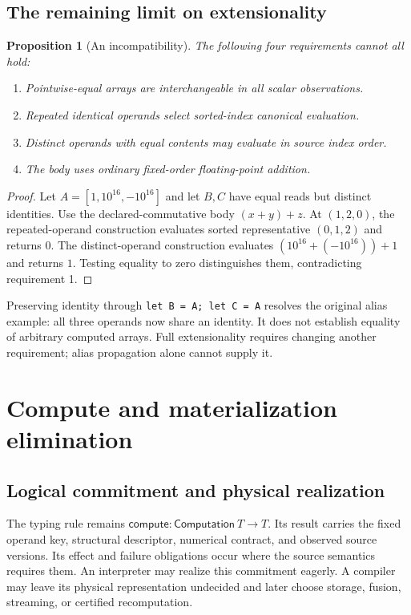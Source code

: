 \documentclass[11pt]{article}
\newtheorem{proposition}[theorem]{Proposition}
\begin{document}
\subsection{The remaining limit on extensionality}
\begin{proposition}[An incompatibility]
The following four requirements cannot all hold:
\begin{enumerate}
\item Pointwise-equal arrays are interchangeable in all scalar observations.
\item Repeated identical operands select sorted-index canonical evaluation.
\item Distinct operands with equal contents may evaluate in source index order.
\item The body uses ordinary fixed-order floating-point addition.
\end{enumerate}
\end{proposition}
\begin{proof}
Let $A=[1,10^{16},-10^{16}]$ and let $B,C$ have equal reads but distinct identities. Use the declared-commutative body $(x+y)+z$. At $(1,2,0)$, the repeated-operand construction evaluates sorted representative $(0,1,2)$ and returns $0$. The distinct-operand construction evaluates $(10^{16}+(-10^{16}))+1$ and returns $1$. Testing equality to zero distinguishes them, contradicting requirement 1.
\end{proof}
Preserving identity through \texttt{let B = A; let C = A} resolves the original alias example: all three operands now share an identity. It does not establish equality of arbitrary computed arrays. Full extensionality requires changing another requirement; alias propagation alone cannot supply it.

\section{Compute and materialization elimination}
\subsection{Logical commitment and physical realization}
The typing rule remains $\mathsf{compute}:\mathsf{Computation}\ T\to T$.
Its result carries the fixed operand key, structural descriptor, numerical contract, and observed source versions. Its effect and failure obligations occur where the source semantics requires them. An interpreter may realize this commitment eagerly. A compiler may leave its physical representation undecided and later choose storage, fusion, streaming, or certified recomputation.
\end{document}
